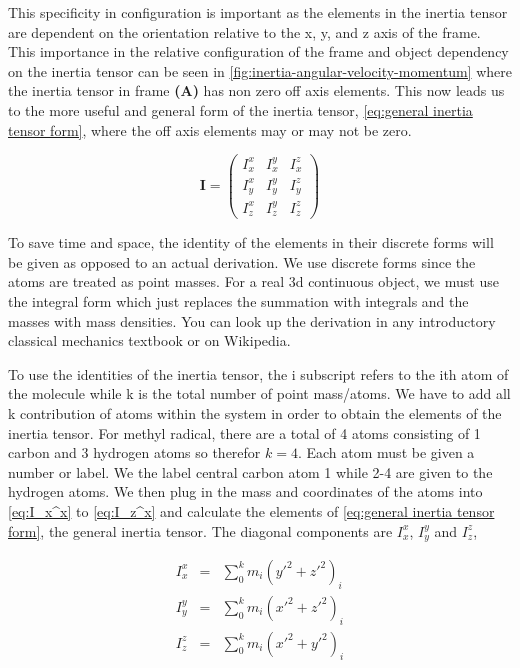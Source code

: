 \documentclass[11pt,a4paper]{book}
\begin{document}
			This specificity in configuration is important as the elements in the inertia tensor are dependent on the orientation relative to the x, y, and z axis of the frame. This importance in the relative configuration of the frame and object dependency on the inertia tensor can be seen in \autoref{fig:inertia-angular-velocity-momentum} where the inertia tensor in frame \textbf{(A)} has non zero off axis elements. This now leads us to the more useful and general form of the inertia tensor, \autoref{eq:general inertia tensor form}, where the off axis elements may or may not be zero.
			
			\begin{equation}
				\label{eq:general inertia tensor form}
				\textbf{I} = 
					\begin{pmatrix}
						I_{x}^x & I_{x}^y & I_{x}^z \\
						I_{y}^x & I_{y}^y & I_{y}^z \\
						I_{z}^x & I_{z}^y & I_{z}^z
					\end{pmatrix}
			\end{equation}		
			
			To save time and space, the identity of the elements in their discrete forms will be given as opposed to an actual derivation. We use discrete forms since the atoms are treated as point masses. For a real 3d continuous object, we must use the integral form which just replaces the summation with integrals and the masses with mass densities. You can look up the derivation in any introductory classical mechanics textbook or on Wikipedia. 
			
			To use the identities of the inertia tensor, the i subscript refers to the ith atom of the molecule while k is the total number of point mass/atoms. We have to add all k contribution of atoms within the system in order to obtain the elements of the inertia tensor. For methyl radical, there are a total of 4 atoms consisting of 1 carbon and 3 hydrogen atoms so therefor $k=4$. Each atom must be given a number or label. We the label central carbon atom 1 while 2-4 are given to the hydrogen atoms. We then plug in the mass and coordinates of the atoms into \autoref{eq:I_x^x} to \autoref{eq:I_z^x} and calculate the elements of \autoref{eq:general inertia tensor form}, the general inertia tensor. The diagonal components are $I_x^x$, $I_y^y$ and $I_z^z$,
			
			\begin{eqnarray}
				\label{eq:I_x^x}
					I_{x}^x &=&\sum_0^k{m_i(y'^{2} + z'^{2})_i}\\
				\label{eq:I_yy}
					I_{y}^y &=&\sum_0^k{m_i(x'^{2} + z'^{2})_i}\\
				\label{eq:I_zz}
					I_{z}^z &=&\sum_0^k{m_i(x'^{2} + y'^{2})_i}
			\end{eqnarray}
			
\end{document}
